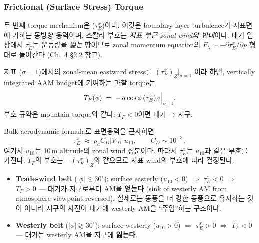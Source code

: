 \subsubsection{Frictional (Surface Stress) Torque}

두 번째 torque mechanism은  ($\tau_E^x$)이다.
이것은 boundary layer turbulence가 지표면에 가하는 동방향 응력이며,
스칼라 부호는 \textit{지표 부근 zonal wind와 반대}이다.  대기 입장에서
$\tau_E^x$는 운동량을 \textit{잃는} 항이므로 zonal momentum equation의
$F_\lambda \sim -\partial \tau_E^x/\partial p$ 형태로 들어간다 (Ch.~4 §2.2 참고).

\begin{definition}\label{def:ch07_torque_friction}
지표 ($\sigma = 1$)에서의 zonal-mean eastward stress를 $(\tau_E^x)_Z|_{\sigma=1}$
이라 하면, vertically integrated AAM budget에 기여하는 마찰 torque는
\begin{equation}\label{eq:ch07_torque_friction_def}
  T_F(\phi)
   \;=\;
   -\,a\cos\phi\,(\tau_E^x)_Z\Bigl|_{\sigma=1}.
\end{equation}
부호 규약은 mountain torque와 같다: $T_F < 0$이면 대기 → 지구.
\end{definition}

Bulk aerodynamic formula로 표면응력을 근사하면
\begin{equation}\label{eq:ch07_torque_bulk}
  \tau_E^x \;\approx\; \rho_a C_D |V_{10}|\,u_{10},
  \qquad C_D \sim 10^{-3},
\end{equation}
여기서 $u_{10}$는 10\,m altitude의 zonal wind 성분이다.  따라서 $\tau_E^x$는
$u_{10}$과 같은 부호를 가진다.  $T_F$의 부호는 $-(\tau_E^x)_Z$와 같으므로
지표 wind의 부호에 따라 결정된다:

\begin{itemize}
  \item \textbf{Trade-wind belt} ($\lvert\phi\rvert \lesssim 30^\circ$):
    surface easterly ($u_{10} < 0$) $\Rightarrow$ $\tau_E^x < 0$ $\Rightarrow$
    $T_F > 0$ — 대기가 지구로부터 AM을 \textbf{얻는다} (sink of westerly AM
    from atmosphere viewpoint reversed).  실제로는 동풍을 더 강한 동풍으로
    유지하는 것이 아니라 지구의 자전이 대기에 westerly AM을 ``주입''하는
    구조이다.
  \item \textbf{Westerly belt} ($\lvert\phi\rvert \gtrsim 30^\circ$):
    surface westerly ($u_{10} > 0$) $\Rightarrow$ $\tau_E^x > 0$ $\Rightarrow$
    $T_F < 0$ — 대기는 westerly AM을 지구에 \textbf{잃는다}.
\end{itemize}

